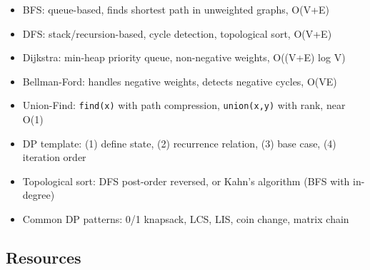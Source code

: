 \documentclass[11pt, a4paper, oneside]{report}
\begin{document}
\begin{cheatsheetbox}
\begin{itemize}[leftmargin=*]
\item BFS: queue-based, finds shortest path in unweighted graphs, O(V+E)
\item DFS: stack/recursion-based, cycle detection, topological sort, O(V+E)
\item Dijkstra: min-heap priority queue, non-negative weights, O((V+E) log V)
\item Bellman-Ford: handles negative weights, detects negative cycles, O(VE)
\item Union-Find: \texttt{find(x)} with path compression, \texttt{union(x,y)} with rank, near O(1)
\item DP template: (1) define state, (2) recurrence relation, (3) base case, (4) iteration order
\item Topological sort: DFS post-order reversed, or Kahn's algorithm (BFS with in-degree)
\item Common DP patterns: 0/1 knapsack, LCS, LIS, coin change, matrix chain
\end{itemize}
\end{cheatsheetbox}

\subsection*{Resources}
\end{document}
